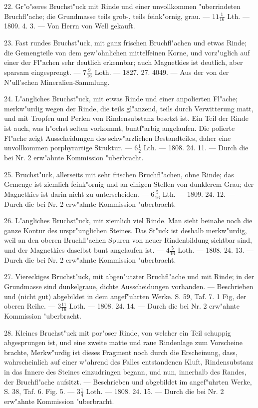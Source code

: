 \documentclass[a4paper, 11pt, oneside, polutonikogreek, german]{article}
\begin{document}
22. Gr"o"seres Bruchst"uck mit Rinde und einer unvollkommen "uberrindeten Bruchfl"ache; die Grundmasse teils grob-, teils feink"ornig, grau. --- $11\frac{1}{16}$ Lth. --- 1809. 4. 3. --- Von Herrn von Well gekauft.

23. Fast rundes Bruchst"uck, mit ganz frischen Bruchfl"achen und etwas Rinde; die Gemengteile von dem gew"ohnlichen mittelfeinen Korne, und vorz"uglich auf einer der Fl"achen sehr deutlich erkennbar; auch Magnetkies ist deutlich, aber sparsam eingesprengt. --- $7\frac{9}{16}$ Loth. --- 1827. 27. 4049. --- Aus der von der N"ull’schen Mineralien-Sammlung.

24. L"angliches Bruchst"uck, mit etwas Rinde und einer anpolierten Fl"ache; merkw"urdig wegen der Rinde, die teils gl"anzend, teils durch Verwitterung matt, und mit Tropfen und Perlen von Rindensubstanz besetzt ist. Ein Teil der Rinde ist auch, was h"ochst selten vorkommt, buntf"arbig angelaufen. Die polierte Fl"ache zeigt Ausscheidungen des schw"arzlichen Bestandteiles, daher eine unvollkommen porphyrartige Struktur. --- $6\frac{1}{2}$ Lth. --- 1808. 24. 11. --- Durch die bei Nr. 2 erw"ahnte Kommission "uberbracht.

25. Bruchst"uck, allerseits mit sehr frischen Bruchfl"achen, ohne Rinde; das Gemenge ist ziemlich feink"ornig und an einigen Stellen von dunklerem Grau; der Magnetkies ist darin nicht zu unterscheiden. --- $6\frac{5}{16}$ Lth. --- 1809. 24. 12. --- Durch die bei Nr. 2 erw"ahnte Kommission "uberbracht.

26. L"angliches Bruchst"uck, mit ziemlich viel Rinde. Man sieht beinahe noch die ganze Kontur des urspr"unglichen Steines. Das St"uck ist deshalb merkw"urdig, weil an den oberen Bruchfl"achen Spuren von neuer Rindenbildung sichtbar sind, und der Magnetkies daselbst bunt angelaufen ist. --- $4\frac{5}{16}$ Loth. --- 1808. 24. 13. --- Durch die bei Nr. 2 erw"ahnte Kommission "uberbracht.

27. Viereckiges Bruchst"uck, mit abgen"utzter Bruchfl"ache und mit Rinde; in der Grundmasse sind dunkelgraue, dichte Ausscheidungen vorhanden. --- Beschrieben und (nicht gut) abgebildet in dem angef"uhrten Werke. S. 59, Taf. 7. 1 Fig, der oberen Reihe. --- $3\frac{11}{16}$ Loth. --- 1808. 24. 14. --- Durch die bei Nr. 2 erw"ahnte Kommission "uberbracht.

28. Kleines Bruchst"uck mit por"oser Rinde, von welcher ein Teil schuppig abgesprungen ist, und eine zweite matte und raue Rindenlage zum Vorscheine brachte, Merkw"urdig ist dieses Fragment noch durch die Erscheinung, dass, wahrscheinlich auf einer w"ahrend des Falles entstandenen Kluft, Rindensubstanz in das Innere des Steines einzudringen begann, und nun, innerhalb des Randes, der Bruchfl"ache aufsitzt. --- Beschrieben und abgebildet im angef"uhrten Werke, S. 38, Taf. 6. Fig. 5. --- $3\frac{1}{4}$ Loth. --- 1808. 24. 15. --- Durch die bei Nr. 2 erw"ahnte Kommission "uberbracht.
\end{document}

